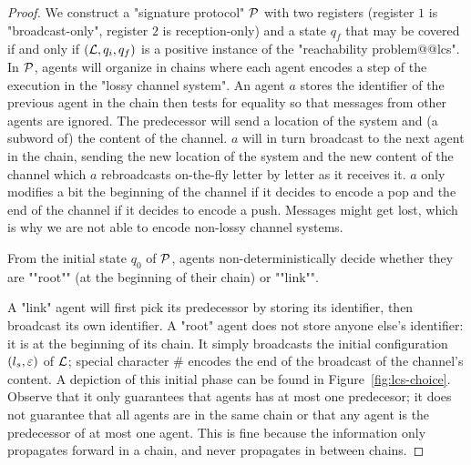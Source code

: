 \begin{proof}
	We construct a "signature protocol" $\mathcal{P}$ with two registers (register $1$ is "broadcast-only", register $2$ is reception-only) and a state $q_f$ that may be covered if and only if $(\mathcal{L}, q_i, q_f)$ is a positive instance of the "reachability problem@@lcs". In $\mathcal{P}$, agents will organize in chains where each agent encodes a step of the execution in the "lossy channel system". An agent $a$ stores the identifier of the previous agent in the chain then tests for equality so that messages from other agents are ignored. The predecessor will send a location of the system and (a subword of) the content of the channel. $a$ will in turn broadcast to the next agent in the chain, sending the new location of the system and the new content of the channel which $a$ rebroadcasts on-the-fly letter by letter as it receives it. $a$ only modifies a bit the beginning of the channel if it decides to encode a pop and the end of the channel if it decides to encode a push. Messages might get lost, which is why we are not able to encode non-lossy channel systems.
	
	\AP From the initial state $q_0$ of $\mathcal{P}$, agents non-deterministically decide whether they are ""root"" (at the beginning of their chain) or ""link"". 
	
	A "link" agent will first pick its predecessor by storing its identifier, then broadcast its own identifier.
	A "root" agent does not store anyone else's identifier: it is at the beginning of its chain. It simply broadcasts the initial configuration $(l_s,\varepsilon)$ of $\mathcal{L}$; special character $\#$ encodes the end of the broadcast of the channel's content.  A depiction of this initial phase can be found in Figure~\ref{fig:lcs-choice}.  
	Observe that it only guarantees that agents has at most one predecesor; it does not guarantee that all agents are in the same chain or that any agent is the predecessor of at most one agent. This is fine because the information only propagates forward in a chain, and never propagates in between chains. 


\end{proof}

